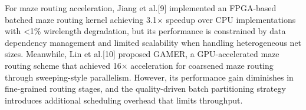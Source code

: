 For maze routing acceleration, Jiang et al.[9] implemented an FPGA-based batched maze routing kernel achieving 3.1× speedup over CPU implementations with <1\% wirelength degradation, but its performance is constrained by data dependency management and limited scalability when handling heterogeneous net sizes. 
Meanwhile, Lin et al.[10] proposed GAMER, a GPU-accelerated maze routing scheme that achieved 16× acceleration for coarsened maze routing through sweeping-style parallelism.
However, its performance gain diminishes in fine-grained routing stages, and the quality-driven batch partitioning strategy introduces additional scheduling overhead that limits throughput.



